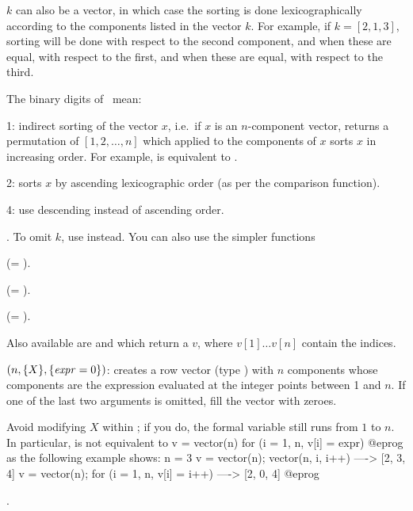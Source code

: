 $k$ can also be a vector, in which case the sorting is done lexicographically
according to the components listed in the vector $k$. For example, if
$k=[2,1,3]$, sorting will be done with respect to the second component, and
when these are equal, with respect to the first, and when these are equal,
with respect to the third.

\noindent The binary digits of \fl\ mean:

\item 1: indirect sorting of the vector $x$, i.e.~if $x$ is an
$n$-component vector, returns a permutation of $[1,2,\dots,n]$ which
applied to the components of $x$ sorts $x$ in increasing order.
For example,  is equivalent to
.

\item 2: sorts $x$ by ascending lexicographic order (as per the
 comparison function).

\item 4: use descending instead of ascending order.

. To omit $k$, use  instead. You can also
use the simpler functions

 (= ).

 (= ).

 (= ).

Also available are  and  which
return a  $v$, where $v[1]\dots v[n]$ contain the indices.

$(n,\{X\},\{\hbox{\it expr\/}=0\})$: creates a row vector (type
) with $n$ components whose components are the expression
 evaluated at the integer points between 1 and $n$. If one of the
last two arguments is omitted, fill the vector with zeroes.

Avoid modifying $X$ within ; if you do, the formal variable
still runs from $1$ to $n$. In particular,  is not
equivalent to
\bprog
    v = vector(n)
    for (i = 1, n, v[i] = expr)
@eprog\noindent
as the following example shows:
\bprog
    n = 3
    v = vector(n); vector(n, i, i++)            ----> [2, 3, 4]
    v = vector(n); for (i = 1, n, v[i] = i++)   ----> [2, 0, 4]
@eprog\noindent


.

